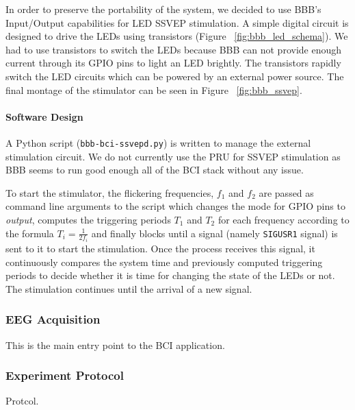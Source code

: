 \documentclass[12pt]{article}
\newcommand\mysubsubsection[1]{\subsubsection{#1}}
\newcommand\mysubsubsubsection[1]{\paragraph{#1}\hspace{0pt}}
\numberwithin{equation}{section}
\numberwithin{figure}{section}
\numberwithin{table}{section}
\begin{document}
\par{
    In order to preserve the portability of the system, we decided to use BBB's
    Input/Output capabilities for LED SSVEP stimulation. A simple digital circuit is designed to
    drive the LEDs using transistors (Figure ~\ref{fig:bbb_led_schema}).
    We had to use transistors to switch the LEDs because BBB can not provide enough current
    through its GPIO pins to light an LED brightly. The transistors rapidly switch
    the LED circuits which can be powered by an external power source. The final
    montage of the stimulator can be seen in Figure ~\ref{fig:bbb_ssvep}.
}

\mysubsubsubsection{Software Design}
\par{
    A Python script (\texttt{bbb-bci-ssvepd.py}) is written to manage the external stimulation circuit. We do not
    currently use the PRU for SSVEP stimulation as BBB seems to run good enough
    all of the BCI stack without any issue.
}
\par{
    To start the stimulator, the flickering frequencies, $f_1$ and $f_2$ are passed as command line arguments to the
    script which changes the mode for GPIO pins to \emph{output}, computes
    the triggering periods $T_1$ and $T_2$ for each frequency according to
    the formula $T_i=\frac{1}{2f_i}$ and finally blocks until a signal (namely
    \texttt{SIGUSR1} signal) is sent to it to start the stimulation.
    Once the process receives this signal, it continuously compares the system time and
    previously computed triggering periods to decide whether it is time for
    changing the state of the LEDs or not. The stimulation continues until
    the arrival of a new signal.
}

\mysubsubsection{EEG Acquisition}
\par{
    This is the main entry point to the BCI application.
}



\mysubsubsection{Experiment Protocol}
\par{
    Protcol.
}
\end{document}
